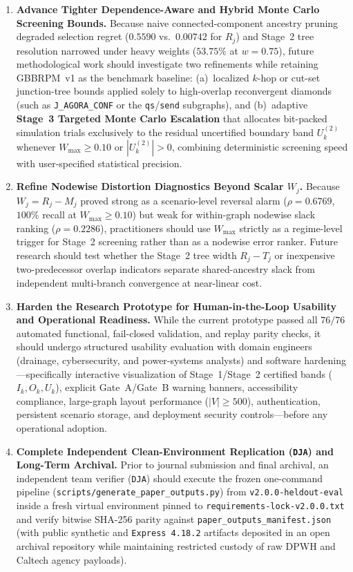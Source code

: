 \begin{enumerate}[label=\arabic*.,leftmargin=*]
condensation with explicit within-SCC physics, or hybrid coupling with
hydrodynamic (SWMM/PCSWMM) and power-flow solvers where bidirectional
redistribution dominates downstream propagation.
\item \textbf{Advance Tighter Dependence-Aware and Hybrid
Monte Carlo Screening Bounds.} Because naive connected-component
ancestry pruning degraded selection regret ($0.5590$ vs.\ $0.00742$
for $R_j$) and Stage~2 tree resolution narrowed under heavy weights
($53.75\%$ at $w=0.75$), future methodological work should investigate
two refinements while retaining GBBRPM~v1 as the benchmark baseline:
(a)~localized $k$-hop or cut-set junction-tree bounds applied solely to
high-overlap reconvergent diamonds (such as \texttt{J\_AGORA\_CONF} or
the \texttt{qs}/\texttt{send} subgraphs), and (b)~adaptive
\textbf{Stage~3 Targeted Monte Carlo Escalation} that allocates
bit-packed simulation trials exclusively to the residual uncertified
boundary band $U_k^{(2)}$ whenever $W_{\max} \ge 0.10$ or
$|U_k^{(2)}| > 0$, combining deterministic screening speed with
user-specified statistical precision.
\item \textbf{Refine Nodewise Distortion Diagnostics Beyond Scalar
$W_j$.} Because $W_j = R_j - M_j$ proved strong as a scenario-level
reversal alarm ($\rho = 0.6769$, $100\%$ recall at $W_{\max} \ge 0.10$)
but weak for within-graph nodewise slack ranking ($\rho = 0.2286$),
practitioners should use $W_{\max}$ strictly as a regime-level trigger
for Stage~2 screening rather than as a nodewise error ranker. Future
research should test whether the Stage~2 tree width $R_j - T_j$ or
inexpensive two-predecessor overlap indicators separate shared-ancestry
slack from independent multi-branch convergence at near-linear cost.
\item \textbf{Harden the Research Prototype for Human-in-the-Loop
Usability and Operational Readiness.} While the current prototype
passed all $76/76$ automated functional, fail-closed validation, and
replay parity checks, it should undergo structured usability evaluation
with domain engineers (drainage, cybersecurity, and power-systems
analysts) and software hardening---specifically interactive
visualization of Stage~1/Stage~2 certified bands ($I_k, O_k, U_k$),
explicit Gate~A/Gate~B warning banners, accessibility compliance,
large-graph layout performance ($|V| \ge 500$), authentication,
persistent scenario storage, and deployment security controls---before
any operational adoption.
\item \textbf{Complete Independent Clean-Environment Replication
(\texttt{DJA}) and Long-Term Archival.} Prior to journal submission and
final archival, an independent team verifier (\texttt{DJA}) should
execute the frozen one-command pipeline
(\texttt{scripts/generate\_\allowbreak paper\_\allowbreak outputs.py})
from \texttt{v2.0.0-heldout-eval} inside a fresh virtual environment
pinned to \texttt{requirements-lock-v2.0.0.txt} and verify bitwise
SHA-256 parity against \texttt{paper\_\allowbreak outputs\_\allowbreak manifest.json}
(with public synthetic and \texttt{Express 4.18.2} artifacts deposited
in an open archival repository while maintaining restricted custody of
raw DPWH and Caltech agency payloads).
\end{enumerate}
